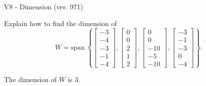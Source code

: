 \begin{exercise}
  \begin{exerciseTitle}V8 - Dimension (ver. 971)\end{exerciseTitle}
  \begin{exerciseStatement}
    Explain how to find the dimension of 
\[W=\mathrm{span}\ \left\{\left[\begin{array}{r}
-3 \\
-4 \\
-3 \\
-1 \\
-4
\end{array}\right] , \left[\begin{array}{r}
0 \\
0 \\
2 \\
1 \\
2
\end{array}\right] , \left[\begin{array}{r}
0 \\
0 \\
-10 \\
-5 \\
-10
\end{array}\right] , \left[\begin{array}{r}
-3 \\
-1 \\
-3 \\
0 \\
-4
\end{array}\right]\right\}.\]



  \end{exerciseStatement}
  \begin{exerciseAnswer}
   The dimension of \(W\) is  \(3\).
  


  \end{exerciseAnswer}
\end{exercise}